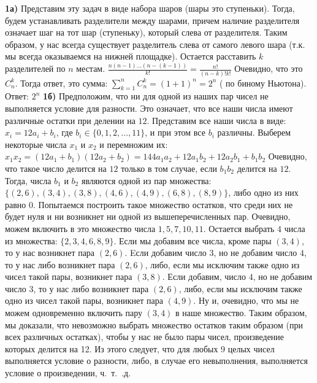 \documentclass[12pt,a4paper,fleqn]{article}
\begin{document}
{\bf 1а)} Представим эту задач в виде набора шаров (шары это ступеньки). Тогда, будем устанавливать разделители между шарами, причем наличие разделителя означает шаг на тот шар (ступеньку), который слева от разделителя. Таким образом, у нас всегда существует разделитель слева от самого левого шара (т.к. мы всегда оказываемся на нижней площадке). Остается расставить $k$ разделителей по $n$ местам. \newline 
$\frac{n(n-1)...(n - (k - 1))}{k!} = \frac{n!}{(n-k)!k!}$ Очевидно, что это $C_n^k$. Тогда ответ, это сумма:\newline
$\sum_{k = 1}^n C_n^k = (1 + 1)^n = 2^n$ ( по биному Ньютона).\newline
Ответ: $2^n$ \newline \newline
{\bf 1б)} Предположим, что ни для одной из наших пар чисел не выполняется условие для разности. Это означает, что все наши числа имеют различные остатки при делении на $12$. Представим все наши числа в виде: $x_i = 12a_i + b_i$, где $b_i \in \{ 0, 1, 2, ..., 11\}$, и при этом все $b_i$ различны. \newline
Выберем некоторые числа $x_1$ и $x_2$ и перемножим их:\newline
$x_1x_2 = (12a_1 + b_1)(12a_2 + b_2) = 144a_1a_2 + 12a_1b_2 + 12a_2b_1 + b_1b_2$ \newline
Очевидно, что такое число делится на $12$ только в том случае, если $b_1b_2$ делится на $12$. Тогда, числа $b_1$ и $b_2$ являются одной из пар множества: $\{(2, 6), (3, 4), (3, 8), (4, 6), (4, 9), (6, 8), (8, 9)\}$, либо одно из них равно $0$. Попытаемся построить такое множество остатков, что среди них не будет нуля и ни возникнет ни одной из вышеперечисленных пар. \newline
Очевидно, можем включить в это множество числа $1, 5, 7, 10, 11$. Остается выбрать 4 числа из множества: $\{2, 3, 4, 6, 8, 9\}$. Если мы добавим все числа, кроме пары $(3, 4)$, то у нас возникнет пара $(2, 6)$. Eсли добавим число $3$, но не добавим число $4$, то у нас либо возникнет пара $(2, 6)$, либо, если мы исключим также одно из чисел такой пары, возникнет пара $(3, 8)$. Если добавим, число $4$, но не добавим число $3$, то у нас либо возникнет пара $(2, 6)$, либо, если мы исключим также одно из чисел такой пары, возникнет пара $(4, 9)$. Ну и, очевидно, что мы не можем одновременно включить пару $(3, 4)$ в наше множество.\newline
Таким образом, мы доказали, что невозможно выбрать множество остатков таким образом (при всех различных остатках), чтобы у нас не было пары чисел, произведение которых делится на 12. Из этого следует, что для любых 9 целых чисел выполняется условие о разности, либо, в случае его невыполнения, выполняется условие о произведении, ч.~т.~.д. \newline \newline
\end{document}
